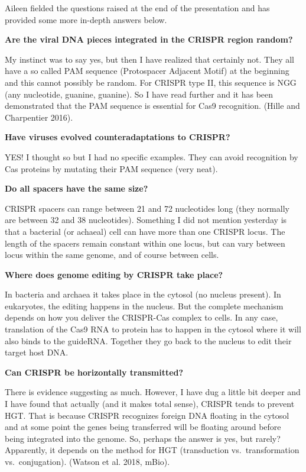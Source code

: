\documentclass[10,portrait]{article}
\begin{document}
Aileen fielded the questions raised at the end of the presentation and
has provided some more in-depth answers below.

\textbf{Are the viral DNA pieces integrated in the CRISPR region
random?}

My instinct was to say yes, but then I have realized that certainly not.
They all have a so called PAM sequence (Protospacer Adjacent Motif) at
the beginning and this cannot possibly be random. For CRISPR type II,
this sequence is NGG (any nucleotide, guanine, guanine). So I have read
further and it has been demonstrated that the PAM sequence is essential
for Cas9 recognition. (Hille and Charpentier 2016).

\textbf{Have viruses evolved counteradaptations to CRISPR?}

YES! I thought so but I had no specific examples. They can avoid
recognition by Cas proteins by mutating their PAM sequence (very neat).

\textbf{Do all spacers have the same size?}

CRISPR spacers can range between 21 and 72 nucleotides long (they
normally are between 32 and 38 nucleotides). Something I did not mention
yesterday is that a bacterial (or achaeal) cell can have more than one
CRISPR locus. The length of the spacers remain constant within one
locus, but can vary between locus within the same genome, and of course
between cells.

\textbf{Where does genome editing by CRISPR take place?}

In bacteria and archaea it takes place in the cytosol (no nucleus
present). In eukaryotes, the editing happens in the nucleus. But the
complete mechanism depends on how you deliver the CRISPR-Cas complex to
cells. In any case, translation of the Cas9 RNA to protein has to happen
in the cytosol where it will also binds to the guideRNA. Together they
go back to the nucleus to edit their target host DNA.

\textbf{Can CRISPR be horizontally transmitted?}

There is evidence suggesting as much. However, I have dug a little bit
deeper and I have found that actually (and it makes total sense), CRISPR
tends to prevent HGT. That is because CRISPR recognizes foreign DNA
floating in the cytosol and at some point the genes being transferred
will be floating around before being integrated into the genome. So,
perhaps the answer is yes, but rarely? Apparently, it depends on the
method for HGT (transduction vs.~transformation vs.~conjugation).
(Watson et al. 2018, mBio).
\end{document}
